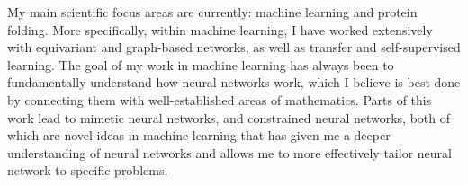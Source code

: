


My main scientific focus areas are currently: machine learning and protein folding.
More specifically, within machine learning, I have worked extensively with equivariant and graph-based networks, as well as transfer and self-supervised learning.
The goal of my work in machine learning has always been to fundamentally understand how neural networks work, which I believe is best done by connecting them with well-established areas of mathematics.
Parts of this work lead to mimetic neural networks, and constrained neural networks, both of which are novel ideas in machine learning that has given me a deeper understanding of neural networks and allows me to more effectively tailor neural network to specific problems.

